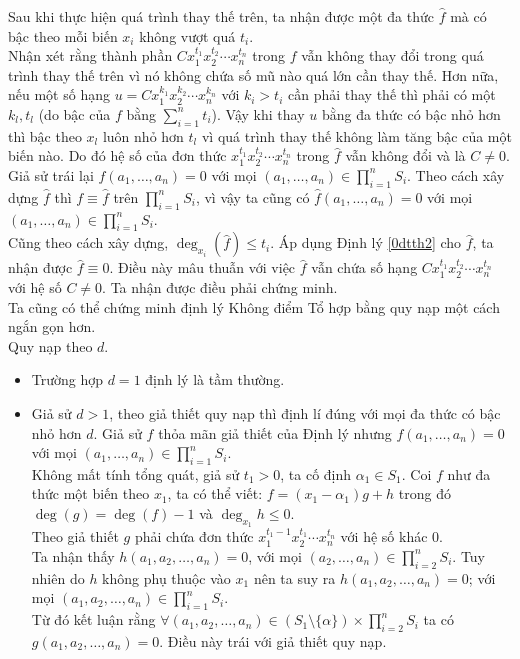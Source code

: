 Sau khi thực hiện quá trình thay thế trên, ta nhận được một đa thức $\widehat{f}$ mà có bậc theo mỗi biến $x_i$ không vượt quá $t_i$.\\
Nhận xét rằng thành phần $Cx_1^{t_1}x_2^{t_2}\cdots x_n^{t_n}$ trong $f$ vẫn không thay đổi trong quá trình thay thế trên vì nó không chứa số mũ nào quá lớn cần thay thế. Hơn nữa, nếu một số hạng $u=Cx_1^{k_1}x_2^{k_2}\cdots x_n^{k_n}$ với $k_i>t_i$ cần phải thay thế thì phải có một $k_l,t_l$ (do bậc của $f$ bằng $\displaystyle \sum \limits_{i=1}^{n}t_i$). Vậy khi thay $u$ bằng đa thức có bậc nhỏ hơn thì bậc theo $x_l$  luôn nhỏ hơn $t_l$ vì quá trình thay thế không làm tăng bậc của một biến nào. Do đó hệ số của đơn thức $x_1^{t_1}x_2^{t_2}\cdots x_n^{t_n}$ trong $\widehat{f}$ vẫn không đổi và là $C \neq 0$.\\
Giả sử trái lại $f(a_1,\dots, a_n)=0$ với mọi $\displaystyle (a_1,\dots, a_n)\in \prod \limits_{i=1}^{n}S_i$. Theo cách xây dựng $\widehat{f}$ thì $f \equiv \widehat{f}$ trên $\displaystyle \prod \limits_{i=1}^{n}S_i$, vì vậy ta cũng có $\widehat{f} (a_1,\dots,a_n)=0$ với mọi $\displaystyle (a_1,\dots, a_n)\in \prod \limits_{i=1}^{n}S_i$.\\
Cũng theo cách xây dựng, $\deg_{x_i}(\widehat{f}) \leq t_i$. Áp dụng Định lý \ref{0dtth2} cho $\widehat{f}$, ta nhận được $\widehat{f} \equiv 0$. Điều này mâu thuẫn với việc $\widehat{f}$ vẫn chứa số hạng $Cx_1^{t_1}x_2^{t_2}\cdots x_n^{t_n}$ với hệ số $C \neq 0$. Ta nhận được điều phải chứng minh.\\
Ta cũng có thể chứng minh định lý Không điểm Tổ hợp bằng quy nạp một cách ngắn gọn hơn.\\
  Quy nạp theo $d$.
\begin{itemize}
	\item Trường hợp $d=1$ định lý là tầm thường.
	\item Giả sử $d>1$, theo giả thiết quy nạp thì định lí đúng với mọi đa thức có bậc nhỏ hơn $d$. Giả sử $f$ thỏa mãn giả thiết của Định lý nhưng $f(a_1,\dots,a_n)=0$ với mọi  $\displaystyle (a_1,\dots, a_n)\in \prod \limits_{i=1}^{n}S_i$.\\
Không mất tính tổng quát, giả sử $t_1>0$, ta cố định $\alpha_1 \in S_1$. Coi $f$ như đa thức một biến theo $x_1$, ta có thể viết: $f=(x_1-\alpha_1)g+h$ trong đó $\deg (g)=\deg (f)-1$ và $\deg_{x_1}h \leq 0$.\\
Theo giả thiết $g$ phải chứa đơn thức $x_1^{t_1-1}x_2^{t_1}\cdots x_n^{t_n}$ với hệ số khác $0$.\\
Ta nhận thấy $h(a_1,a_2, \dots, a_n)=0$, với mọi $\displaystyle (a_2,\dots, a_n)\in \prod \limits_{i=2}^{n}S_i$. Tuy nhiên do $h$ không phụ thuộc vào $x_1$ nên ta suy ra $h(a_1,a_2,\dots, a_n)=0$;  với mọi $\displaystyle (a_1,a_2, \dots, a_n)\in \prod \limits_{i=1}^{n}S_i$.\\
Từ đó kết luận rằng $\displaystyle \forall (a_1,a_2,\dots, a_n) \in \left(S_1 \setminus \{\alpha\} \right) \times \prod \limits_{i=2}^{n}S_i$ ta có $g(a_1,a_2,\dots,a_n)=0$. Điều này trái với giả thiết quy nạp.
\end{itemize}		
